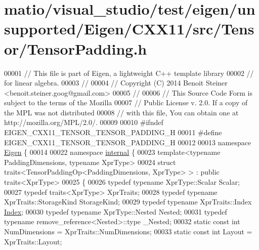 \hypertarget{matio_2visual__studio_2test_2eigen_2unsupported_2_eigen_2_c_x_x11_2src_2_tensor_2_tensor_padding_8h_source}{}\section{matio/visual\+\_\+studio/test/eigen/unsupported/\+Eigen/\+C\+X\+X11/src/\+Tensor/\+Tensor\+Padding.h}
\label{matio_2visual__studio_2test_2eigen_2unsupported_2_eigen_2_c_x_x11_2src_2_tensor_2_tensor_padding_8h_source}

\begin{DoxyCode}
00001 \textcolor{comment}{// This file is part of Eigen, a lightweight C++ template library}
00002 \textcolor{comment}{// for linear algebra.}
00003 \textcolor{comment}{//}
00004 \textcolor{comment}{// Copyright (C) 2014 Benoit Steiner <benoit.steiner.goog@gmail.com>}
00005 \textcolor{comment}{//}
00006 \textcolor{comment}{// This Source Code Form is subject to the terms of the Mozilla}
00007 \textcolor{comment}{// Public License v. 2.0. If a copy of the MPL was not distributed}
00008 \textcolor{comment}{// with this file, You can obtain one at http://mozilla.org/MPL/2.0/.}
00009 
00010 \textcolor{preprocessor}{#ifndef EIGEN\_CXX11\_TENSOR\_TENSOR\_PADDING\_H}
00011 \textcolor{preprocessor}{#define EIGEN\_CXX11\_TENSOR\_TENSOR\_PADDING\_H}
00012 
00013 \textcolor{keyword}{namespace }\hyperlink{namespace_eigen}{Eigen} \{
00014 
00022 \textcolor{keyword}{namespace }\hyperlink{namespaceinternal}{internal} \{
00023 \textcolor{keyword}{template}<\textcolor{keyword}{typename} PaddingDimensions, \textcolor{keyword}{typename} XprType>
00024 \textcolor{keyword}{struct }traits<TensorPaddingOp<PaddingDimensions, XprType> > : \textcolor{keyword}{public} traits<XprType>
00025 \{
00026   \textcolor{keyword}{typedef} \textcolor{keyword}{typename} XprType::Scalar Scalar;
00027   \textcolor{keyword}{typedef} traits<XprType> XprTraits;
00028   \textcolor{keyword}{typedef} \textcolor{keyword}{typename} XprTraits::StorageKind StorageKind;
00029   \textcolor{keyword}{typedef} \textcolor{keyword}{typename} XprTraits::Index \hyperlink{namespace_eigen_a62e77e0933482dafde8fe197d9a2cfde}{Index};
00030   \textcolor{keyword}{typedef} \textcolor{keyword}{typename} XprType::Nested Nested;
00031   \textcolor{keyword}{typedef} \textcolor{keyword}{typename} remove\_reference<Nested>::type \_Nested;
00032   \textcolor{keyword}{static} \textcolor{keyword}{const} \textcolor{keywordtype}{int} NumDimensions = XprTraits::NumDimensions;
00033   \textcolor{keyword}{static} \textcolor{keyword}{const} \textcolor{keywordtype}{int} Layout = XprTraits::Layout;

\end{DoxyCode}
